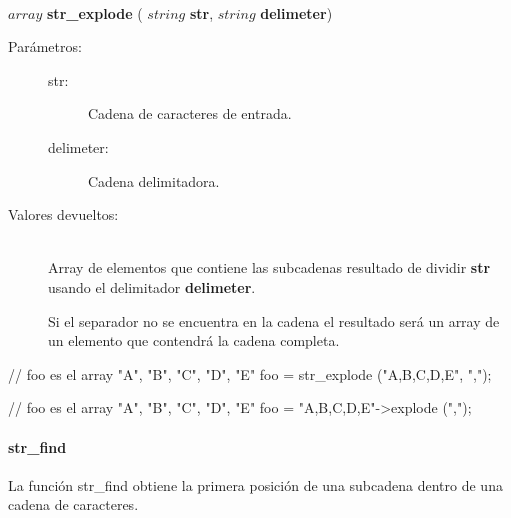 \begin{framed}
\hfill \\ $array$ \textbf{str\_explode} ( $string$ \textbf{str}, $string$ \textbf{delimeter})  
\begin{description}
\item [Parámetros:] \hfill 
   \begin{description}
   \item[str:] Cadena de caracteres de entrada.
   \item[delimeter:] Cadena delimitadora.
   \end{description}
\item[Valores devueltos:] \hfill \\
   Array de elementos que contiene las subcadenas resultado de dividir \textbf{str} usando el delimitador \textbf{delimeter}.
   
   Si el separador no se encuentra en la cadena el resultado será un array de un elemento que contendrá la cadena completa.
\end{description}
\end{framed}


\begin{myverbatim}
   // foo es el array {"A", "B", "C", "D", "E"}
   foo = str_explode ("A,B,C,D,E", ","); 
   
   // foo es el array {"A", "B", "C", "D", "E"}
   foo = "A,B,C,D,E"->explode (",");
\end{myverbatim}

\paragraph {str\_find}
La función str\_find obtiene la primera posición de una subcadena dentro de una cadena de caracteres. 

